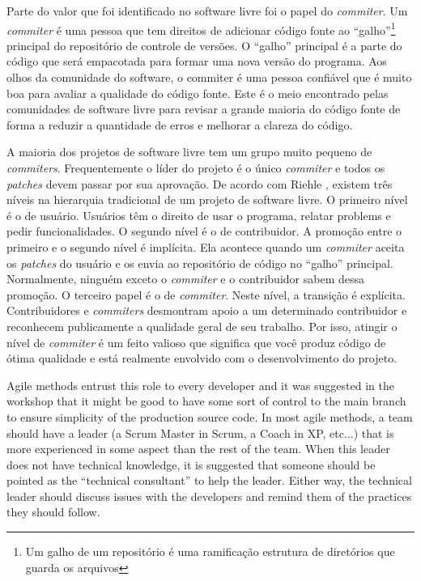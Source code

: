 Parte do valor que foi identificado no software livre foi o papel do
\emph{commiter}. Um \emph{commiter} é uma pessoa que tem direitos de
adicionar código fonte ao ``galho''\footnote{Um galho de um
  repositório é uma ramificação estrutura de diretórios que guarda os
  arquivos} principal do repositório de controle de versões. O
``galho'' principal é a parte do código que será empacotada para
formar uma nova versão do programa. Aos olhos da comunidade do
software, o commiter é uma pessoa confiável que é muito boa para
avaliar a qualidade do código fonte. Este é o meio encontrado pelas
comunidades de software livre para revisar a grande maioria do código
fonte de forma a reduzir a quantidade de erros e melhorar a clareza do
código.

A maioria dos projetos de software livre tem um grupo muito pequeno de
\emph{commiters}. Frequentemente o líder do projeto é o único
\emph{commiter} e todos os \emph{patches} devem passar por sua
aprovação. De acordo com Riehle \cite{Riehle2007}, existem três níveis
na hierarquia tradicional de um projeto de software livre. O primeiro
nível é o de usuário. Usuários têm o direito de usar o programa,
relatar problems e pedir funcionalidades. O segundo nível é o de
contribuidor. A promoção entre o primeiro e o segundo nível é
implícita. Ela acontece quando um \emph{commiter} aceita os
\emph{patches} do usuário e os envia ao repositório de código no
``galho'' principal. Normalmente, ninguém exceto o \emph{commiter} e o
contribuidor sabem dessa promoção. O terceiro papel é o de
\emph{commiter}. Neste nível, a transição é explícita. Contribuidores
e \emph{commiters} desmontram apoio a um determinado contribuidor e
reconhecem publicamente a qualidade geral de seu trabalho. Por isso,
atingir o nível de \emph{commiter} é um feito valioso que significa
que você produz código de ótima qualidade e está realmente envolvido
com o desenvolvimento do projeto.


Agile methods entrust this role to every developer and it was
suggested in the workshop that it might be good to have some sort of
control to the main branch to ensure simplicity of the production
source code. In most agile methods, a team should have a leader (a
Scrum Master in Scrum, a Coach in XP, etc...) that is more experienced
in some aspect than the rest of the team. When this leader does not
have technical knowledge, it is suggested that someone should be
pointed as the ``technical consultant'' to help the leader. Either
way, the technical leader should discuss issues with the developers
and remind them of the practices they should follow.


